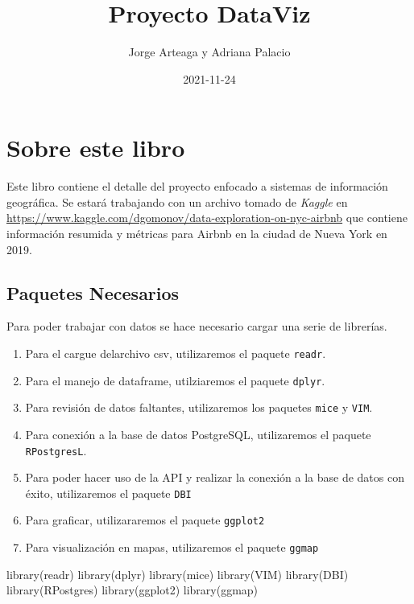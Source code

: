 \documentclass[
]{book}
\title{Proyecto DataViz}
\author{Jorge Arteaga y Adriana Palacio}
\date{2021-11-24}
\newenvironment{Shaded}{\begin{snugshade}}{\end{snugshade}}
\newcommand{\FunctionTok}[1]{\textcolor[rgb]{0.00,0.00,0.00}{#1}}
\newcommand{\NormalTok}[1]{#1}
\providecommand{\tightlist}{%
  \setlength{\itemsep}{0pt}\setlength{\parskip}{0pt}}
\begin{document}
\maketitle

{
\setcounter{tocdepth}{1}
\tableofcontents
}
\hypertarget{sobre-este-libro}{%
\chapter{Sobre este libro}\label{sobre-este-libro}}

Este libro contiene el detalle del proyecto enfocado a sistemas de información geográfica. Se estará trabajando con un archivo tomado de \emph{Kaggle} en \url{https://www.kaggle.com/dgomonov/data-exploration-on-nyc-airbnb} que contiene información resumida y métricas para Airbnb en la ciudad de Nueva York en 2019.

\hypertarget{paquetes-necesarios}{%
\section{Paquetes Necesarios}\label{paquetes-necesarios}}

Para poder trabajar con datos se hace necesario cargar una serie de librerías.

\begin{enumerate}
\def\labelenumi{\arabic{enumi}.}
\tightlist
\item
  Para el cargue delarchivo csv, utilizaremos el paquete \texttt{readr}.
\item
  Para el manejo de dataframe, utilziaremos el paquete \texttt{dplyr}.
\item
  Para revisión de datos faltantes, utilizaremos los paquetes \texttt{mice} y \texttt{VIM}.
\item
  Para conexión a la base de datos PostgreSQL, utilizaremos el paquete \texttt{RPostgresL}.
\item
  Para poder hacer uso de la API y realizar la conexión a la base de datos con éxito, utilizaremos el paquete \texttt{DBI}
\item
  Para graficar, utilizararemos el paquete \texttt{ggplot2}
\item
  Para visualización en mapas, utilizaremos el paquete \texttt{ggmap}
\end{enumerate}

\begin{Shaded}
\begin{Highlighting}[]
\FunctionTok{library}\NormalTok{(readr)}
\FunctionTok{library}\NormalTok{(dplyr)}
\FunctionTok{library}\NormalTok{(mice)}
\FunctionTok{library}\NormalTok{(VIM)}
\FunctionTok{library}\NormalTok{(DBI)}
\FunctionTok{library}\NormalTok{(RPostgres)}
\FunctionTok{library}\NormalTok{(ggplot2)}
\FunctionTok{library}\NormalTok{(ggmap)}
\end{Highlighting}
\end{Shaded}
\end{document}

